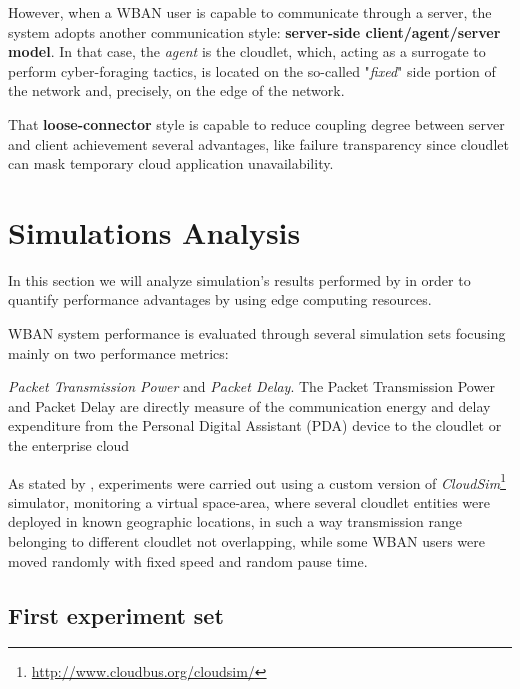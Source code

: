 \documentclass[sigchi]{acmart}
\begin{document}
However, when a WBAN user is capable to communicate through a server, the system adopts another communication style: \textbf{server-side client/agent/server model}. In that case, the \textit{agent} is the cloudlet, which, acting as a surrogate to perform cyber-foraging tactics, is located on the so-called "\textit{fixed}" side portion of the network and, precisely, on the edge of the network. 

That \textbf{loose-connector} style is capable to reduce coupling degree between server and client achievement several advantages, like failure transparency since cloudlet can mask temporary cloud application unavailability.

\section{Simulations Analysis}

In this section we will analyze simulation's results performed by \citet{MSAReport} in order to quantify performance advantages by using edge computing resources. 

WBAN system performance is evaluated through several simulation sets focusing mainly on two performance metrics:

\vspace{0.3cm}

\begin{quoting}[font=itshape, begintext={``}, endtext={''\cite[par.~4.2]{MSAReport}}]
\textit{Packet Transmission Power} and \textit{Packet Delay}. The Packet Transmission Power and Packet Delay are directly measure of the communication energy and delay expenditure from the Personal Digital Assistant (PDA) device to the cloudlet or the enterprise cloud
\end{quoting}

\vspace{0.3cm}

As stated by \citet{MSAReport}, experiments were carried out using a custom version of \textit{CloudSim}\footnote{\url{http://www.cloudbus.org/cloudsim/}} simulator, monitoring a virtual space-area, where several cloudlet entities were deployed in known geographic locations, in such a way transmission range belonging to different cloudlet not overlapping, while some WBAN users were moved randomly with fixed speed and random pause time.



\subsection{First experiment set}
\end{document}
